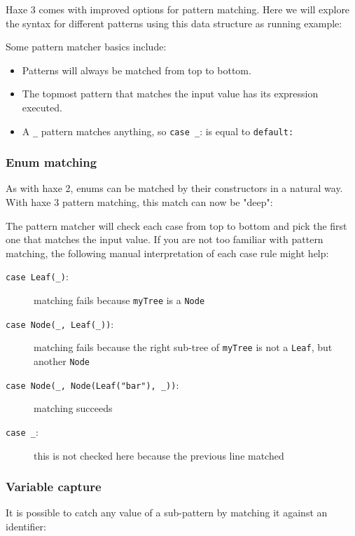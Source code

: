 \documentclass{article}
\newcommand{\expr}[1]{\texttt{#1}}
\newcommand{\haxe}[2][]{%
}
\begin{document}
Haxe 3 comes with improved options for pattern matching. Here we will explore the syntax for different patterns using this data structure as running example:

\haxe[firstline=1,lastline=4]{assets/PatternMatching.hx}

Some pattern matcher basics include:

\begin{itemize}
	\item Patterns will always be matched from top to bottom.
	\item The topmost pattern that matches the input value has its expression executed.
	\item A \expr{_} pattern matches anything, so \expr{case _}: is equal to \expr{default:}
\end{itemize}

\subsubsection{Enum matching}

As with haxe 2, enums can be matched by their constructors in a natural way. With haxe 3 pattern matching, this match can now be "deep":

\haxe[firstline=8,lastline=19]{assets/PatternMatching.hx}

The pattern matcher will check each case from top to bottom and pick the first one that matches the input value. If you are not too familiar with pattern matching, the following manual interpretation of each case rule might help:

\begin{description}
	\item[\expr{case Leaf(_)}:] matching fails because \expr{myTree} is a \expr{Node}
	\item[\expr{case Node(_, Leaf(_))}:] matching fails because the right sub-tree of \expr{myTree} is not a \expr{Leaf}, but another \expr{Node}
	\item[\expr{case Node(_, Node(Leaf("bar"), _))}:] matching succeeds
	\item[\expr{case _}:] this is not checked here because the previous line matched
\end{description}

\subsubsection{Variable capture}

It is possible to catch any value of a sub-pattern by matching it against an identifier:
\end{document}
